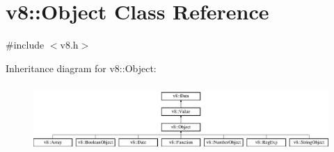 \hypertarget{classv8_1_1_object}{}\section{v8\+:\+:Object Class Reference}
\label{classv8_1_1_object}


{\ttfamily \#include $<$v8.\+h$>$}

Inheritance diagram for v8\+:\+:Object\+:\begin{figure}[H]
\begin{center}
\leavevmode
\includegraphics[height=2.601626cm]{classv8_1_1_object}
\end{center}
\end{figure}
